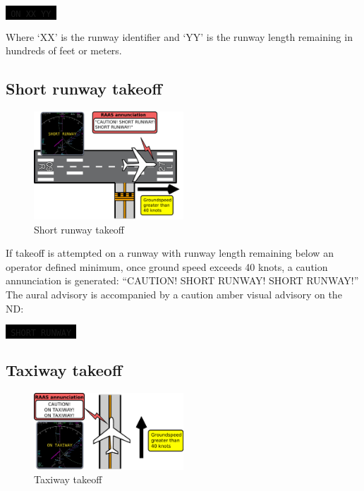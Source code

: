 \documentclass[a4paper,12pt]{article}
\newcommand{\visualadvisory}[3][b]{%
    \ifthenelse{\equal{#1}{b}}{\begin{center}}{}
    \noindent
    \colorbox{black}{\textcolor{#2visualadvisorycolor}{\large\texttt{~#3~}}}
    \ifthenelse{\equal{#1}{b}}{\end{center}}{}}
\begin{document}
\visualadvisory{nonroutine}{ON XX YY}

\noindent Where `XX' is the runway identifier and `YY' is the runway
length remaining in hundreds of feet or meters.

\subsection{Short runway takeoff}
\label{subsec:ShortRwyTakeoffMon}

\begin{figure}
\vspace{-2em}
\begin{center}
\includegraphics[width=0.5\textwidth]{../src/rwy_short_takeoff.pdf}
\end{center}
\caption{Short runway takeoff}
\vspace{-2em}
\end{figure}

If takeoff is attempted on a runway with runway length remaining below an
operator defined minimum, once ground speed exceeds 40 knots, a caution
annunciation is generated: ``CAUTION! SHORT RUNWAY! SHORT RUNWAY!'' The
aural advisory is accompanied by a caution amber visual advisory on the
ND:

\visualadvisory{nonroutine}{SHORT RUNWAY}

\subsection{Taxiway takeoff}
\label{subsec:TwyTakeoffMon}

\begin{figure}
\vspace{-4em}
\begin{center}
\includegraphics[width=0.5\textwidth]{../src/twy_takeoff.pdf}
\end{center}
\caption{Taxiway takeoff}
\vspace{-4em}
\end{figure}
\end{document}
